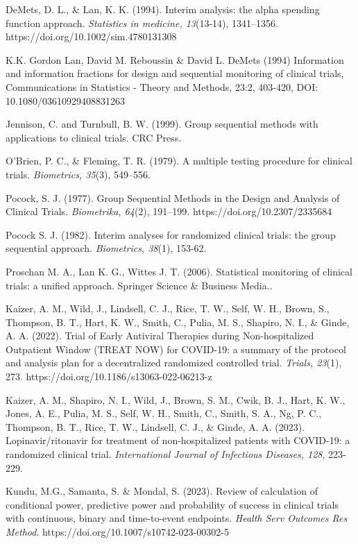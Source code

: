 \documentclass[Afour,sageh,times,square,numbers]{sagej}
\begin{document}
\begin{thebibliography}{99}
DeMets, D. L., \& Lan, K. K. (1994). Interim analysis: the alpha spending function approach. \textit{Statistics in medicine, 13}(13-14), 1341–1356. https://doi.org/10.1002/sim.4780131308

K.K. Gordon Lan, David M. Reboussin \& David L. DeMets (1994) Information and information fractions for design and sequential monitoring of clinical trials, Communications in Statistics - Theory and Methods, 23:2, 403-420, DOI: 10.1080/03610929408831263

Jennison, C. and Turnbull, B. W. (1999). Group sequential methods with applications to clinical trials. CRC Press.

O'Brien, P. C., \& Fleming, T. R. (1979). A multiple testing procedure for clinical trials. \textit{Biometrics, 35}(3), 549–556.

Pocock, S. J. (1977). Group Sequential Methods in the Design and Analysis of Clinical Trials. \textit{Biometrika, 64}(2), 191–199. https://doi.org/10.2307/2335684

Pocock S. J. (1982). Interim analyses for randomized clinical trials: the group sequential approach. \textit{Biometrics, 38}(1), 153-62.

Proschan M. A., Lan K. G., Wittes J. T. (2006). Statistical monitoring of clinical trials: a unified approach. Springer Science \& Business Media..

Kaizer, A. M., Wild, J., Lindsell, C. J., Rice, T. W., Self, W. H., Brown, S., Thompson, B. T., Hart, K. W., Smith, C., Pulia, M. S., Shapiro, N. I., \& Ginde, A. A. (2022). Trial of Early Antiviral Therapies during Non-hospitalized Outpatient Window (TREAT NOW) for COVID-19: a summary of the protocol and analysis plan for a decentralized randomized controlled trial. \textit{Trials, 23}(1), 273. https://doi.org/10.1186/s13063-022-06213-z

Kaizer, A. M., Shapiro, N. I., Wild, J., Brown, S. M., Cwik, B. J., Hart, K. W., Jones, A. E., Pulia, M. S., Self, W. H., Smith, C., Smith, S. A., Ng, P. C., Thompson, B. T., Rice, T. W., Lindsell, C. J., \& Ginde, A. A. (2023). Lopinavir/ritonavir for treatment of non-hospitalized patients with COVID-19: a randomized clinical trial. \textit{International Journal of Infectious Diseases, 128}, 223-229.

Kundu, M.G., Samanta, S. \& Mondal, S. (2023). Review of calculation of conditional power, predictive power and probability of success in clinical trials with continuous, binary and time-to-event endpoints. \textit{Health Serv Outcomes Res Method}. https://doi.org/10.1007/s10742-023-00302-5


\end{thebibliography}
\end{document}

